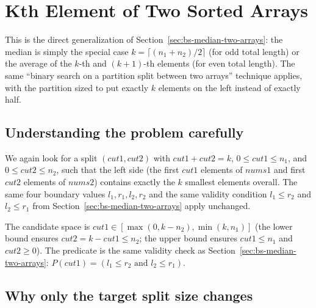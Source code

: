 \section{Kth Element of Two Sorted Arrays}
\label{sec:bs-kth-element}


\begin{patternbox}
This is the direct generalization of
Section~\ref{sec:bs-median-two-arrays}: the median is simply the special
case $k = \lceil (n_1+n_2)/2 \rceil$ (for odd total length) or the average
of the $k$-th and $(k{+}1)$-th elements (for even total length). The same
``binary search on a partition split between two arrays'' technique
applies, with the partition sized to put exactly $k$ elements on the left
instead of exactly half.
\end{patternbox}

\subsection*{Understanding the problem carefully}

We again look for a split $(\textit{cut1}, \textit{cut2})$ with
$\textit{cut1} + \textit{cut2} = k$, $0 \le \textit{cut1} \le n_1$, and
$0 \le \textit{cut2} \le n_2$, such that the left side (the first
$\textit{cut1}$ elements of $\textit{nums1}$ and first $\textit{cut2}$
elements of $\textit{nums2}$) contains exactly the $k$ smallest elements
overall. The same four boundary values $l_1, r_1, l_2, r_2$ and the same
validity condition $l_1 \le r_2$ and $l_2 \le r_1$ from
Section~\ref{sec:bs-median-two-arrays} apply unchanged.

\begin{ideabox}
The candidate space is $\textit{cut1} \in [\max(0, k-n_2), \min(k, n_1)]$
(the lower bound ensures $\textit{cut2} = k - \textit{cut1} \le n_2$; the
upper bound ensures $\textit{cut1} \le n_1$ and $\textit{cut2} \ge 0$).
The predicate is the same validity check as
Section~\ref{sec:bs-median-two-arrays}: $P(\textit{cut1}) = (l_1 \le r_2
\text{ and } l_2 \le r_1)$.
\end{ideabox}

\subsection*{Why only the target split size changes}

